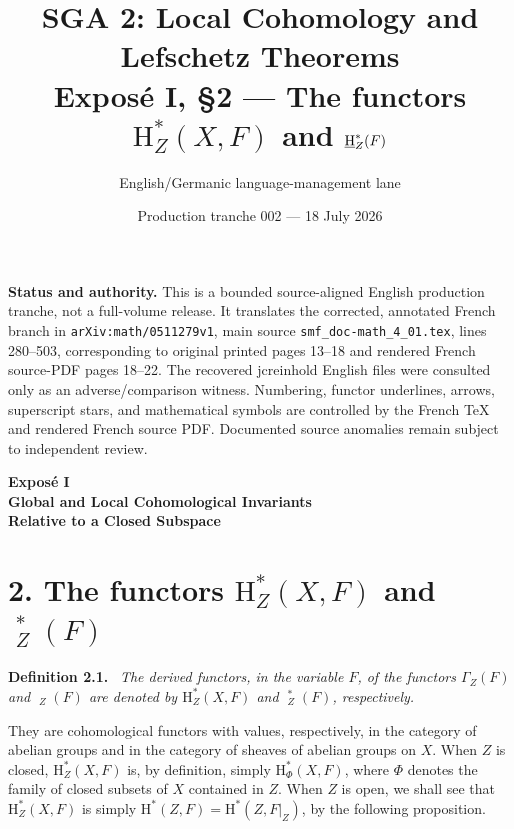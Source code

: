 \documentclass[11pt]{article}
\title{\textbf{SGA 2: Local Cohomology and Lefschetz Theorems}\\[0.5em]
  \large Expos\'e I, \S2 --- The functors $\mathrm H_Z^*(X,F)$ and
  $\uH_Z^*(F)$}
\author{English/Germanic language-management lane}
\date{Production tranche 002 --- 18 July 2026}
\newcommand{\uGamma}{\mathop{\underline{\Gamma}}\nolimits}
\newcommand{\uH}{\mathop{\underline{\mathrm H}}\nolimits}
\newcommand{\restr}[2]{#1\vert_{#2}}
\newcommand{\srcpage}[1]{%
  \marginpar{\raggedright\scriptsize\color{rulegray}French printed p.~#1}}
\newenvironment{sgastatement}[1]
  {\par\addvspace{0.8\baselineskip}\noindent\textbf{#1.}\ \itshape}
  {\par\addvspace{0.4\baselineskip}}
\begin{document}
\maketitle

\noindent\colorbox{statusgray}{%
  \parbox{\dimexpr\linewidth-2\fboxsep\relax}{\small
  \textbf{Status and authority.} This is a bounded source-aligned English
  production tranche, not a full-volume release. It translates the corrected,
  annotated French branch in \texttt{arXiv:math/0511279v1}, main source
  \texttt{smf\_doc-math\_4\_01.tex}, lines 280--503, corresponding to original
  printed pages 13--18 and rendered French source-PDF pages 18--22. The
  recovered jcreinhold English files were consulted only as an
  adverse/comparison witness. Numbering, functor underlines, arrows,
  superscript stars, and mathematical symbols are controlled by the French
  TeX and rendered French source PDF. Documented source anomalies remain
  subject to independent review.}}

\vspace{1.5em}

\begin{center}
  \Large\bfseries Expos\'e I\\[0.6em]
  \large Global and Local Cohomological Invariants\\
  Relative to a Closed Subspace
\end{center}

\section*{2. The functors $\mathrm H_Z^*(X,F)$ and $\uH_Z^*(F)$}

\srcpage{13}
\begin{sgastatement}{Definition 2.1}
The derived functors, in the variable $F$, of the functors $\Gamma_Z(F)$
and $\uGamma_Z(F)$ are denoted by $\mathrm H_Z^*(X,F)$ and $\uH_Z^*(F)$,
respectively.
\end{sgastatement}

They are cohomological functors with values, respectively, in the category
of abelian groups and in the category of sheaves of abelian groups on $X$.
When $Z$ is closed, $\mathrm H_Z^*(X,F)$ is, by definition, simply
$\mathrm H_\Phi^*(X,F)$, where $\Phi$ denotes the family of closed subsets
of $X$ contained in $Z$. When $Z$ is open, we shall see that
$\mathrm H_Z^*(X,F)$ is simply
$\mathrm H^*(Z,F)=\mathrm H^*(Z,\restr{F}{Z})$, by the following
proposition.
\end{document}
